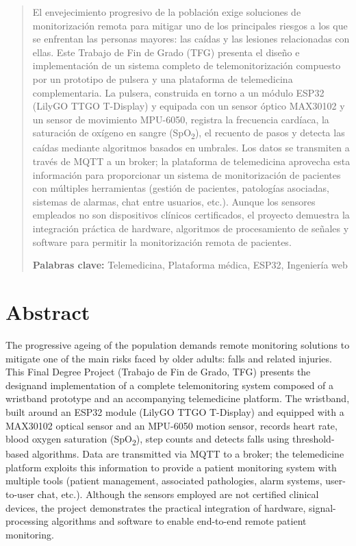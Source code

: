\documentclass[12pt, a4paper]{article}
\begin{document}





\begin{abstract}
    
	El envejecimiento progresivo de la población exige soluciones de monitorización remota para mitigar uno de los principales riesgos a los que se enfrentan las personas mayores: las caídas y las lesiones relacionadas con ellas. Este Trabajo de Fin de Grado (TFG) presenta el diseño e implementación de un sistema completo de telemonitorización compuesto por un prototipo de pulsera y una plataforma de telemedicina complementaria. La pulsera, construida en torno a un módulo ESP32 (LilyGO TTGO T-Display) y equipada con un sensor óptico MAX30102 y un sensor de movimiento MPU-6050, registra la frecuencia cardíaca, la saturación de oxígeno en sangre (SpO\textsubscript{2}), el recuento de pasos y detecta las caídas mediante algoritmos basados en umbrales. Los datos se transmiten a través de MQTT a un broker; la plataforma de telemedicina aprovecha esta información para proporcionar un sistema de monitorización de pacientes con múltiples herramientas (gestión de pacientes, patologías asociadas, sistemas de alarmas, chat entre usuarios, etc.). Aunque los sensores empleados no son dispositivos clínicos certificados, el proyecto demuestra la integración práctica de hardware, algoritmos de procesamiento de señales y software para permitir la monitorización remota de pacientes.
	
	
	
	{\bfseries\large Palabras clave:} Telemedicina, Plataforma médica, ESP32, Ingeniería web

\end{abstract}

\section*{Abstract}

	The progressive ageing of the population demands remote monitoring solutions to mitigate one of the main risks faced by older adults: falls and related injuries. This Final Degree Project (Trabajo de Fin de Grado, TFG) presents the designand implementation of a complete telemonitoring system composed of a wristband prototype and an accompanying telemedicine platform. The wristband, built around an ESP32 module (LilyGO TTGO T-Display) and equipped with a MAX30102 optical sensor and an MPU-6050 motion sensor, records heart rate, blood oxygen saturation (SpO\textsubscript{2}), step counts and detects falls using threshold-based algorithms. Data are transmitted via MQTT to a broker; the telemedicine platform exploits this information to provide a patient monitoring system with multiple tools (patient management, associated pathologies, alarm systems, user-to-user chat, etc.). Although the sensors employed are not certified clinical devices, the project demonstrates the practical integration of hardware, signal-processing algorithms and software to enable end-to-end remote patient monitoring.
	
\end{document}
